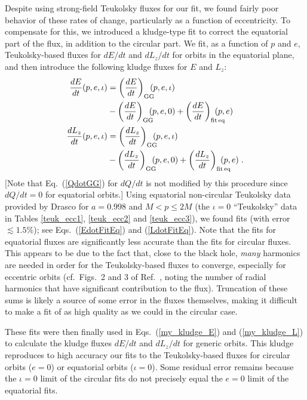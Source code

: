\documentclass[aps,prd,twocolumn,showpacs,groupedaddress,nofootinbib]{revtex4}
\begin{document}
Despite using strong-field Teukolsky fluxes for our fit, we found
fairly poor behavior of these rates of change, particularly as a
function of eccentricity.  To compensate for this, we introduced a
kludge-type fit to correct the equatorial part of the flux, in
addition to the circular part.  We fit, as a function of $p$ and $e$,
Teukolsky-based fluxes for $dE/dt$ and $dL_z/dt$ for orbits in the
equatorial plane, and then introduce the following kludge fluxes for
$E$ and $L_z$:
\begin{align}
  \frac{dE}{dt}(p,e,\iota)& =\left(\frac{dE}{dt}\right)_{\rm
    GG}\hskip-0.25cm(p,e,\iota) \nonumber\\ & -\left(\frac{dE}{dt}\right)_{\rm
    GG}\hskip-0.25cm(p,e,0)+\left(\frac{dE}{dt}\right)_{\rm
    fit\,eq}\hskip-0.5cm(p,e)\label{my_kludge_E}
  \\
  \frac{dL_z}{dt}(p,e,\iota)& =\left(\frac{dL_z}{dt}\right)_{\rm
    GG}\hskip-0.25cm(p,e,\iota) \nonumber\\& -\left(\frac{dL_z}{dt}\right)_{\rm
    GG}\hskip-0.25cm(p,e,0)+\left(\frac{dL_z}{dt}\right)_{\rm
    fit\,eq}\hskip-0.5cm(p,e)\;.\label{my_kludge_L}
\end{align}
[Note that Eq.\ (\ref{QdotGG}) for $dQ/dt$ is not modified by this
procedure since $dQ/dt=0$ for equatorial orbits.]  Using equatorial
non-circular Teukolsky data provided by Drasco {\cite{hughes_drasco,data}}
for $a = 0.998$ and $M < p \leq 2M$ (the $\iota = 0$ ``Teukolsky''
data in Tables \ref{teuk_ecc1}, \ref{teuk_ecc2} and \ref{teuk_ecc3}),
we found fits (with error $\lesssim 1.5$\%); see Eqs.\
(\ref{EdotFitEq}) and (\ref{LdotFitEq}).  Note that the 
fits for equatorial fluxes are significantly less accurate than the fits
for circular fluxes.  This appears to be due to the fact that, close
to the black hole, {\it many} harmonics are needed in order for the
Teukolsky-based fluxes to converge, especially for eccentric orbits
(cf.\ Figs.\ 2 and 3 of Ref.\ {\cite{hughes_drasco}}, noting the
number of radial harmonics that have significant contribution to the
flux).  Truncation of these sums is likely a source of some error in
the fluxes themselves, making it difficult to make a fit of as high
quality as we could in the circular case.

These fits were then finally used in Eqs.\ (\ref{my_kludge_E}) and
(\ref{my_kludge_L}) to calculate the kludge fluxes $dE/dt$ and
$dL_z/dt$ for generic orbits.  This kludge reproduces to high accuracy
our fits to the Teukolsky-based fluxes for circular orbits ($e = 0$)
or equatorial orbits ($\iota = 0$).  Some residual error remains
because the $\iota = 0$ limit of the circular fits do not precisely
equal the $e = 0$ limit of the equatorial fits.
\end{document}
